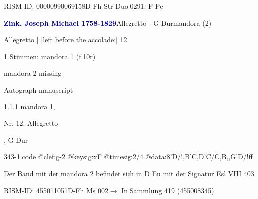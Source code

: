 \documentclass[twocolumn]{book}
\begin{document}
\par RISM-ID: 00000990069158\newline D-Fh  Str Duo 0291; F-Pc
\par \vspace{7pt} \textcolor{darkblue}{\textbf{Zink, Joseph Michael  1758-1829}}\hfillplus{\textbf{[343]}}\newline Allegretto - G-Dur\newline mandora (2)
\par \begin{itshape}[f.10r, at left:] Allegretto | [left before the accolade:] 12.\end{itshape} 
\par \textcolor{darkblue}{}  1 Stimmen: mandora 1  (f.10r)\newline \begin{small} mandora 2 missing\end{small} \newline Autograph manuscript
\par 1.1.1  mandora 1, \begin{itshape}Nr. 12. Allegretto\end{itshape}, G-Dur  
\begin{filecontents*}{343-1.code}
@clef:g-2
@keysig:xF
@timesig:2/4
@data:8'D/!,B'C,D'C/C,B,,G'D/!ff
\end{filecontents*}
\newline
%
\par Der Band mit der mandora 2 befindet sich in D Eu mit der Signatur Esl VIII 403
\par RISM-ID: 455011051\newline D-Fh  Ms 002\newline $\rightarrow$ In Sammlung 419 (455008345)
      
\end{document}
